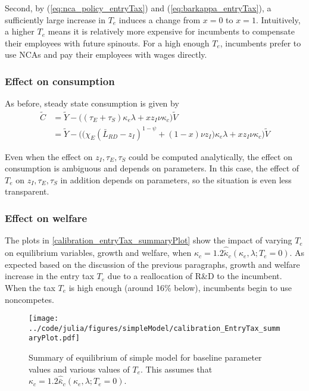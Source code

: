 \documentclass[11pt,english]{article}
\theoremstyle{remark}
\begin{document}
Second, by (\ref{eq:nca_policy_entryTax}) and (\ref{eq:barkappa_entryTax}), a sufficiently large increase in $T_e$ induces a change from $x = 0$ to $x = 1$. Intuitively, a higher $T_e$ means it is relatively more expensive for incumbents to compensate their employees with future spinouts. For a high enough $T_e$, incumbents prefer to use NCAs and pay their employees with wages directly.

\subsubsection{Effect on consumption}

As before, steady state consumption is given by
\begin{align}
\tilde{C} &= \tilde{Y} - \Big( (\tau_E  + \tau_S)\kappa_e \lambda + x z_I \nu \kappa_c \Big) \tilde{V} \\
&= \tilde{Y} - \Big( \big( \chi_E (\bar{L}_{RD} - z_I)^{1-\psi} + (1-x) \nu z_I \big) \kappa_e \lambda + x z_I \nu \kappa_c \Big) \tilde{V}  \label{cs:scen3:consumption_eq}
\end{align}

Even when the effect on $z_I,\tau_E,\tau_S$ could be computed analytically, the effect on consumption is ambiguous and depends on parameters. In this case, the effect of $T_e$ on $z_I,\tau_E,\tau_S$ in addition depends on parameters, so the situation is even less transparent. 

\subsubsection{Effect on welfare}

The plots in \autoref{calibration_entryTax_summaryPlot} show the impact of varying $T_e$ on equilibrium variables, growth and welfare, when $\kappa_c = 1.2 \hat{\tilde{\kappa}}_c(\kappa_e,\lambda;T_e = 0)$. As expected based on the discussion of the previous paragraphs, growth and welfare increase in the entry tax $T_e$ due to a reallocation of R\&D to the incumbent. When the tax $T_e$ is high enough (around 16\% below), incumbents begin to use noncompetes.  

\begin{figure}[]
	\texttt{[image: ../code/julia/figures/simpleModel/calibration\_EntryTax\_summaryPlot.pdf]}
	\caption{Summary of equilibrium of simple model for baseline parameter values and various values of $T_e$. This assumes that $\kappa_c = 1.2 \hat{\bar{\kappa}}_c(\kappa_e,\lambda;T_e = 0)$.}
	\label{calibration_entryTax_summaryPlot}
\end{figure}
\end{document}
